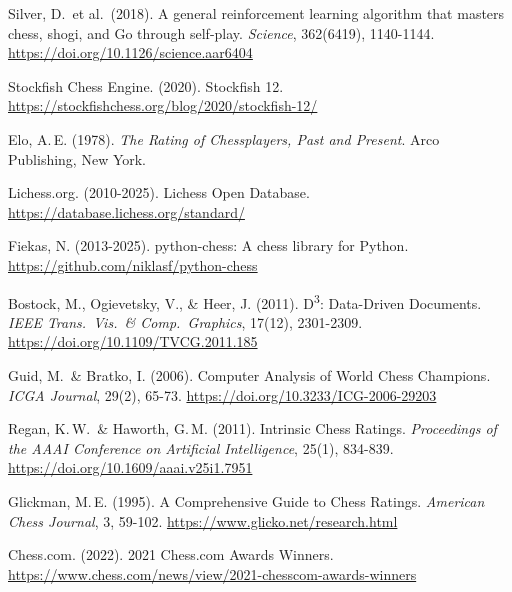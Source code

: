 \documentclass[a4paper]{article}
\begin{document}
\begin{enumerate}[itemsep=0.25em, topsep=0.25em,label={[\arabic*]}]

  \item \hypertarget{ref1}{}Silver, D.\ et al.\ (2018). A general reinforcement learning algorithm that masters chess, shogi, and Go through self-play. \textit{Science}, 362(6419), 1140-1144. \url{https://doi.org/10.1126/science.aar6404}

  \item \hypertarget{ref2}{}Stockfish Chess Engine. (2020). Stockfish 12. \url{https://stockfishchess.org/blog/2020/stockfish-12/}

  \item \hypertarget{ref3}{}Elo, A.\,E. (1978). \textit{The Rating of Chessplayers, Past and Present}. Arco Publishing, New York.

  \item \hypertarget{ref4}{}Lichess.org. (2010-2025). Lichess Open Database. \url{https://database.lichess.org/standard/}

  \item \hypertarget{ref5}{}Fiekas, N. (2013-2025). python-chess: A chess library for Python. \url{https://github.com/niklasf/python-chess}

  \item \hypertarget{ref6}{}Bostock, M., Ogievetsky, V., \& Heer, J. (2011). D\textsuperscript{3}: Data-Driven Documents. \textit{IEEE Trans.\ Vis.\ \& Comp.\ Graphics}, 17(12), 2301-2309. \url{https://doi.org/10.1109/TVCG.2011.185}

  \item \hypertarget{ref7}{}Guid, M.\ \& Bratko, I. (2006). Computer Analysis of World Chess Champions. \textit{ICGA Journal}, 29(2), 65-73. \url{https://doi.org/10.3233/ICG-2006-29203}

  \item \hypertarget{ref8}{}Regan, K.\,W.\ \& Haworth, G.\,M. (2011). Intrinsic Chess Ratings. \textit{Proceedings of the AAAI Conference on Artificial Intelligence}, 25(1), 834-839. \url{https://doi.org/10.1609/aaai.v25i1.7951}

  \item \hypertarget{ref9}{}Glickman, M.\,E. (1995). A Comprehensive Guide to Chess Ratings. \textit{American Chess Journal}, 3, 59-102. \url{https://www.glicko.net/research.html}

  \item \hypertarget{ref10}{}Chess.com. (2022). 2021 Chess.com Awards Winners. \url{https://www.chess.com/news/view/2021-chesscom-awards-winners}

\end{enumerate}
\end{document}
